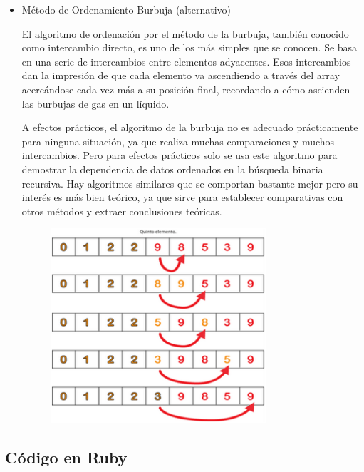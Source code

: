 \begin{itemize}
\item Método de Ordenamiento Burbuja (alternativo)

El algoritmo de ordenación por el método de la burbuja, también conocido como intercambio directo, es uno de los más simples que se conocen. Se basa en una serie de intercambios entre elementos adyacentes. Esos intercambios dan la impresión de que cada elemento va ascendiendo a través del array acercándose cada vez más a su posición final, recordando a cómo ascienden las burbujas de gas en un líquido.

A efectos prácticos, el algoritmo de la burbuja no es adecuado prácticamente para ninguna situación, ya que realiza muchas comparaciones y muchos intercambios. Pero para efectos prácticos solo se usa este algoritmo para demostrar la dependencia de datos ordenados en la búsqueda binaria recursiva. Hay algoritmos similares que se comportan bastante mejor pero su interés es más bien teórico, ya que sirve para establecer comparativas con otros métodos y extraer conclusiones teóricas.

\begin{figure}[H]
\centering
    \includegraphics[width=8cm]{imagen_3.png}
\end{figure}

\end{itemize}

\newpage
\subsection{Código en Ruby}


